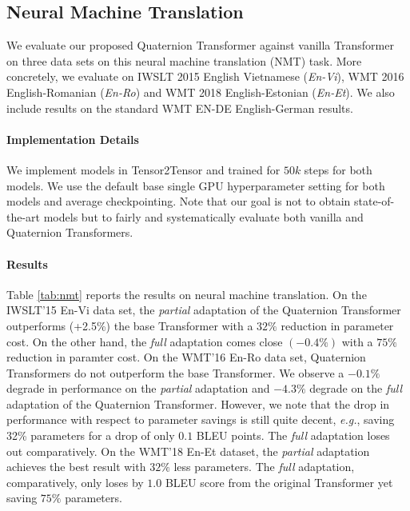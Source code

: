 \documentclass[11pt,a4paper]{article}
\begin{document}
\subsection{Neural Machine Translation}
We evaluate our proposed Quaternion Transformer against vanilla Transformer on three data sets on this neural machine translation (NMT) task. More concretely, we evaluate on IWSLT 2015 English Vietnamese (\textit{En-Vi}), WMT 2016 English-Romanian (\textit{En-Ro}) and WMT 2018 English-Estonian (\textit{En-Et}). We also include results on the standard WMT EN-DE English-German results.


\paragraph{Implementation Details} We implement models in Tensor2Tensor and trained for $50k$ steps for both models. We use the default base single GPU hyperparameter setting for both models and average checkpointing. Note that our goal is not to obtain state-of-the-art models but to fairly and systematically evaluate both vanilla and Quaternion Transformers.

\paragraph{Results}

Table \ref{tab:nmt} reports the results on neural machine translation. On the IWSLT'15 En-Vi data set, the \emph{partial} adaptation of the Quaternion Transformer outperforms (+2.5\%) the base Transformer with a $32\%$ reduction in parameter cost. On the other hand, the \emph{full} adaptation comes close $(-0.4\%)$ with a $75\%$ reduction in paramter cost. On the WMT'16 En-Ro data set, Quaternion Transformers do not outperform the base Transformer. We observe a $-0.1\%$ degrade in performance on the \emph{partial} adaptation and $-4.3\%$ degrade on the \emph{full} adaptation of the Quaternion Transformer. However, we note that the drop in performance with respect to parameter savings is still quite decent, \emph{e.g.}, saving 32\% parameters for a drop of only $0.1$ BLEU points. The \emph{full} adaptation loses out comparatively. On the WMT'18 En-Et dataset, the \emph{partial} adaptation achieves the best result with $32\%$ less parameters. The \emph{full} adaptation, comparatively, only loses by $1.0$ BLEU score from the original Transformer yet saving $75\%$ parameters.
\end{document}
